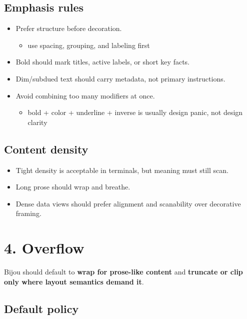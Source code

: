 \subsection{Emphasis rules}\label{record-021-emphasis-rules}

\begin{itemize}
\tightlist
\item
  Prefer structure before decoration.

  \begin{itemize}
  \tightlist
  \item
    use spacing, grouping, and labeling first
  \end{itemize}
\item
  Bold should mark titles, active labels, or short key facts.
\item
  Dim/subdued text should carry metadata, not primary instructions.
\item
  Avoid combining too many modifiers at once.

  \begin{itemize}
  \tightlist
  \item
    bold + color + underline + inverse is usually design panic, not design clarity
  \end{itemize}
\end{itemize}

\subsection{Content density}\label{record-021-content-density}

\begin{itemize}
\tightlist
\item
  Tight density is acceptable in terminals, but meaning must still scan.
\item
  Long prose should wrap and breathe.
\item
  Dense data views should prefer alignment and scanability over decorative framing.
\end{itemize}

\section{4. Overflow}\label{record-021-overflow}

Bijou should default to \textbf{wrap for prose-like content} and \textbf{truncate or clip only where layout semantics demand it}.

\subsection{Default policy}\label{record-021-default-policy}

